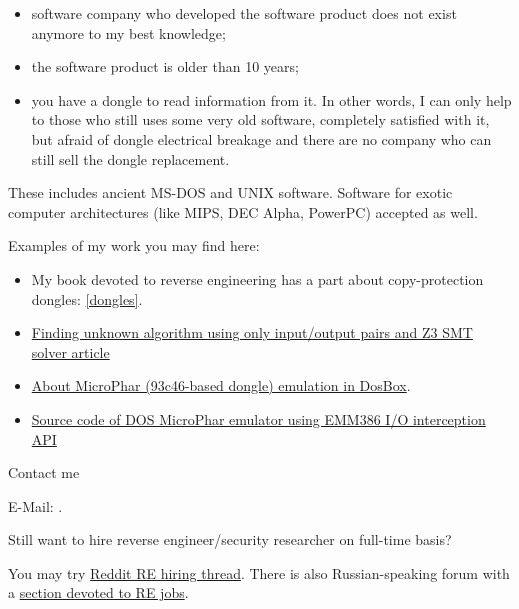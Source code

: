 \begin{itemize}
\item software company who developed the software product does not exist anymore to my best knowledge;
\item the software product is older than 10 years;
\item you have a dongle to read information from it. In other words, I can only help to those who still uses some very old software, completely satisfied with it, but afraid of dongle electrical breakage and there are no company who can still sell the dongle replacement.
\end{itemize}

These includes ancient MS-DOS and UNIX software. Software for exotic computer architectures (like MIPS, DEC Alpha, PowerPC) accepted as well.

Examples of my work you may find here:

\begin{itemize}
\item My book devoted to reverse engineering has a part about copy-protection dongles: \ref{dongles}.
\item \href{http://yurichev.com/writings/z3_rockey.pdf}{Finding unknown algorithm using only input/output pairs and Z3 SMT solver article}
\item \href{http://yurichev.com/blog/56/}{About MicroPhar (93c46-based dongle) emulation in DosBox}.
\item \href{http://conus.info/dongle/src/microph.asm}{Source code of DOS MicroPhar emulator using EMM386 I/O interception API}
\end{itemize}

\large Contact me \normalsize

E-Mail: \GTT{\EMAIL}.

\large Still want to hire reverse engineer/security researcher on full-time basis? \normalsize

You may try \href{https://www.reddit.com/r/ReverseEngineering/comments/49cza0/rreverseengineerings_2015_triannual_hiring_thread/}{Reddit RE hiring thread}.
There is also Russian-speaking forum with a \href{https://forum.reverse4you.org/forumdisplay.php?f=252}{section devoted to RE jobs}.

\vspace*{\fill}
\vfill
